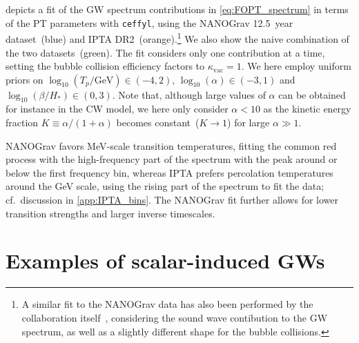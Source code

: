 \documentclass{article}
\begin{document}
 depicts a fit of the GW spectrum contributions in \cref{eq:FOPT_spectrum} in terms of the PT parameters with \texttt{ceffyl}, using the NANOGrav 12.5~year dataset~(blue) and IPTA DR2~(orange).\footnote{%
	A similar fit to the NANOGrav data has also been performed by the collaboration itself~\cite{NANOGrav:2021flc}, considering the sound wave contibution to the GW spectrum, as well as a slightly different shape for the bubble collisions.
}
We also show the naive combination of the two datasets~(green).
The fit considers only one contribution at a time, setting the bubble collision efficiency factors to $\kappa_\mathrm{vac}=1$.
We here employ uniform priors on $\log_{10}(T_p/\si{\GeV}) \in (-4,2)$, $\log_{10}(\alpha) \in (-3,1)$ and $\log_{10}(\beta/H_*) \in (0,3)$. 
Note that, although large values of $\alpha$ can be obtained for instance in the CW model, we here only consider $\alpha<10$ as the kinetic energy fraction $K\equiv\alpha/(1+\alpha)$ becomes constant~($K\to 1$) for large $\alpha\gg 1$.

NANOGrav favors MeV-scale transition temperatures, fitting the common red process with the high-frequency part of the spectrum with the peak around or below the first frequency bin, whereas IPTA prefers percolation temperatures around the GeV scale, using the rising part of the spectrum to fit the data; cf.~discussion in \cref{app:IPTA_bins}.
The NANOGrav fit further allows for lower transition strengths and larger inverse timescales.


\section{Examples of scalar-induced GWs}
\label{app:scalar_induced}
\end{document}
